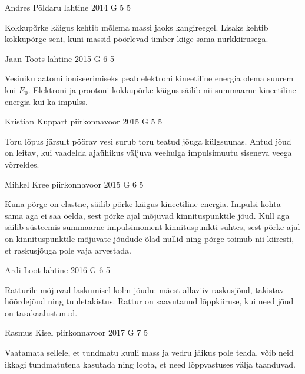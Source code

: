 \documentclass[11pt, twoside]{article}
\begin{document}
{%
{Andres Põldaru} %
{lahtine} %
{2014} %
{G 5} %
{5} %
{

\ifHint
Kokkupõrke käigus kehtib mõlema massi jaoks kangireegel. Lisaks kehtib kokkupõrge seni, kuni massid pöörlevad ümber kiige sama nurkkiirusega.
\fi
}

{Jaan Toots} %
{lahtine} %
{2015} %
{G 6} %
{5} %
{

\ifHint
Vesiniku aatomi ioniseerimiseks peab elektroni kineetiline energia olema suurem kui $E_0$. Elektroni ja prootoni kokkupõrke käigus säilib nii summaarne kineetiline energia kui ka impulss.
\fi
}

{Kristian Kuppart} %
{piirkonnavoor} %
{2015} %
{G 5} %
{5} %
{

\ifHint
Toru lõpus järsult pöörav vesi surub toru teatud jõuga külgsuunas. Antud jõud on leitav, kui vaadelda ajaühikus väljuva veehulga impulsimuutu siseneva veega võrreldes.
\fi
}

{Mihkel Kree} %
{piirkonnavoor} %
{2015} %
{G 6} %
{5} %
{

\ifHint
Kuna põrge on elastne, säilib põrke käigus kineetiline energia. Impulsi kohta sama aga ei saa öelda, sest põrke ajal mõjuvad kinnituspunktile jõud. Küll aga säilib süsteemis summaarne impulsimoment kinnituspunkti suhtes, sest põrke ajal on kinnituspunktile mõjuvate jõudude õlad nullid ning põrge toimub nii kiiresti, et raskusjõuga pole vaja arvestada.
\fi
}

{Ardi Loot} %
{lahtine} %
{2016} %
{G 6} %
{5} %
{

\ifHint
Ratturile mõjuvad laskumisel kolm jõudu: mäest allaviiv raskusjõud, takistav hõõrdejõud ning tuuletakistus. Rattur on saavutanud lõppkiiruse, kui need jõud on tasakaalustunud.
\fi
}

{Rasmus Kisel} %
{piirkonnavoor} %
{2017} %
{G 7} %
{5} %
{

\ifHint
Vaatamata sellele, et tundmatu kuuli mass ja vedru jäikus pole teada, võib neid ikkagi tundmatutena kasutada ning loota, et need lõppvastuses välja taanduvad.
\fi
}

}
\end{document}
